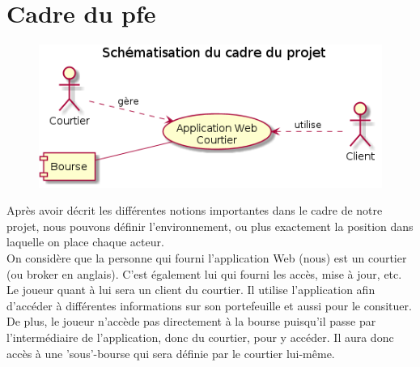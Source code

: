 \section{Cadre du pfe}
\begin{figure}[H]
  \center
  \includegraphics[scale=0.7]{../graph/schemaProjet.png}
\end{figure}

Après avoir décrit les différentes notions importantes dans le cadre de notre projet, nous pouvons définir l'environnement, ou plus exactement la position dans laquelle on place chaque acteur.\\

On considère que la personne qui fourni l'application Web (nous) est un courtier (ou broker en anglais). C'est également lui qui fourni les accès, mise à jour, etc. \\

Le joueur quant à lui sera un client du courtier. Il utilise l'application afin d'accéder à différentes informations sur son portefeuille et aussi pour le consituer. De plus, le joueur n'accède pas directement à la bourse puisqu'il passe par l'intermédiaire de l'application, donc du courtier, pour y accéder. Il aura donc accès à une 'sous'-bourse qui sera définie par le courtier lui-même.